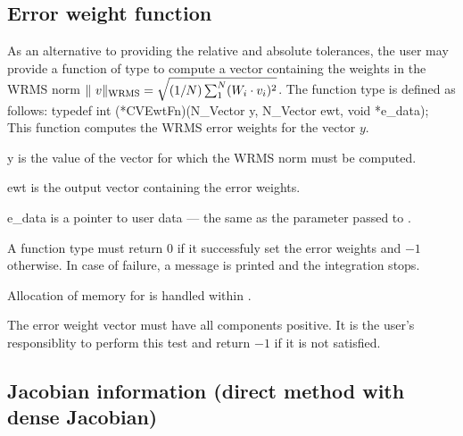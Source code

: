 \subsection{Error weight function}
\label{ss:ewtsetFn}
As an alternative to providing the relative and absolute tolerances, the user may
provide a function of type  to compute a vector  containing the
weights in the WRMS norm 
$\|\ v \|_{\mbox{\scriptsize WRMS}} = \sqrt{(1/N)\sum_1^N (W_i \cdot v_i)^2}$.
The function type  is defined as follows:
{
  typedef int (*CVEwtFn)(N\_Vector y, N\_Vector ewt, void *e\_data);
}
{
  This function computes the WRMS error weights for the vector $y$.
}
{
  \begin{args}[e\_data]
  \item[y]
    is the value of the vector for which the WRMS norm must be computed.
  \item[ewt]
    is the output vector containing the error weights.
  \item[e\_data]
    is a pointer to user data --- the same as the       
    parameter passed to .   
  \end{args}
}
{
  A  function type must return $0$ if it successfuly set
  the error weights and $-1$ otherwise. In case of failure, a message is printed
  and the integration stops.
}
{
  Allocation of memory for  is handled within {\cvode}.

  {\warn}The error weight vector must have all components positive. It is the
  user's responsiblity to perform this test and return $-1$ if it is not 
  satisfied.
}


\subsection{Jacobian information (direct method with dense Jacobian)}
\label{ss:djacFn}

